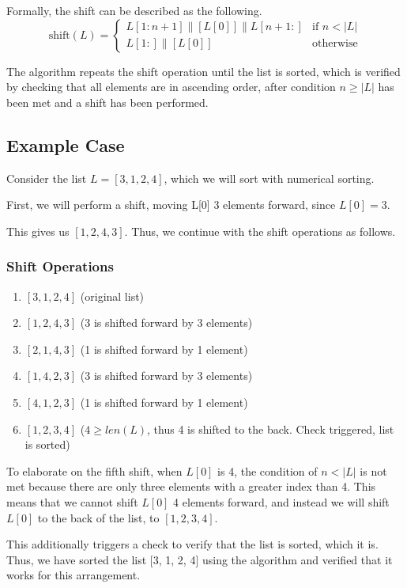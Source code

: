 \documentclass[12pt]{article}
\begin{document}
Formally, the shift can be described as the following.
\[
\text{shift}(L) = 
\begin{cases}
L[1:n+1] \| [L[0]] \| L[n+1:] & \text{if } n < |L|\\
L[1:] \| [L[0]] & \text{otherwise}
\end{cases}
\]

The algorithm repeats the shift operation until the list is sorted, which is verified by checking that all elements are in ascending order, after condition $n \geq |L|$ has been met and a shift has been performed.

\subsection*{Example Case}

{
Consider the list $L=[3,1,2,4]$, which we will sort with numerical sorting.

First, we will perform a shift, moving L[0] 3 elements forward, since $L[0]=3$.

This gives us $[1,2,4,3]$. Thus, we continue with the shift operations as follows.
}%

\subsubsection{Shift Operations}
\begin{enumerate}[start=0]
    \item $[3, 1, 2, 4]$ (original list)
    \item $[1, 2, 4, 3]$ (3 is shifted forward by 3 elements)
    \item $[2, 1, 4, 3]$ (1 is shifted forward by 1 element)
    \item $[1, 4, 2, 3]$ (3 is shifted forward by 3 elements)
    \item $[4, 1, 2, 3]$ (1 is shifted forward by 1 element)
    \item $[1, 2, 3, 4]$ ($4 \geq len(L)$, thus 4 is shifted to the back. Check triggered, list is sorted)
\end{enumerate}

To elaborate on the fifth shift, when $L[0]$ is 4, the condition of $n < |L|$ is not met because there are only three elements with a greater index than 4. This means that we cannot shift $L[0]$ 4 elements forward, and instead we will shift $L[0]$ to the back of the list, to $[1,2,3,4]$.

This additionally triggers a check to verify that the list is sorted, which it is. Thus, we have sorted the list [3, 1, 2, 4] using the algorithm and verified that it works for this arrangement.
\end{document}

